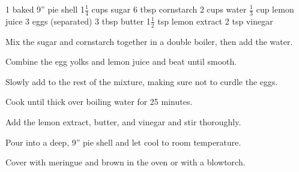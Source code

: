 \dishtype{\dessert}
\dishother{\vegetarian}
\begin{ingreds}
    1 baked 9'' pie shell
    1$\frac{1}{4}$ cups sugar
    6 tbsp cornstarch
    2 cups water
    $\frac{1}{3}$ cup lemon juice
    3 eggs (separated)
    3 tbsp butter
    1$\frac{1}{2}$ tsp lemon extract
    2 tsp vinegar 
\end{ingreds}
\begin{method}
    Mix the sugar and cornstarch together in a double boiler, then add the water.\par
    Combine the egg yolks and lemon juice and beat until smooth.\par
    Slowly add to the rest of the mixture, making sure not to curdle the eggs.\par
    Cook until thick over boiling water for 25 minutes.\par
    Add the lemon extract, butter, and vinegar and stir thoroughly.\par
    Pour into a deep, 9'' pie shell and let cool to room temperature.\par
    Cover with meringue and brown in the oven or with a blowtorch.
\end{method}